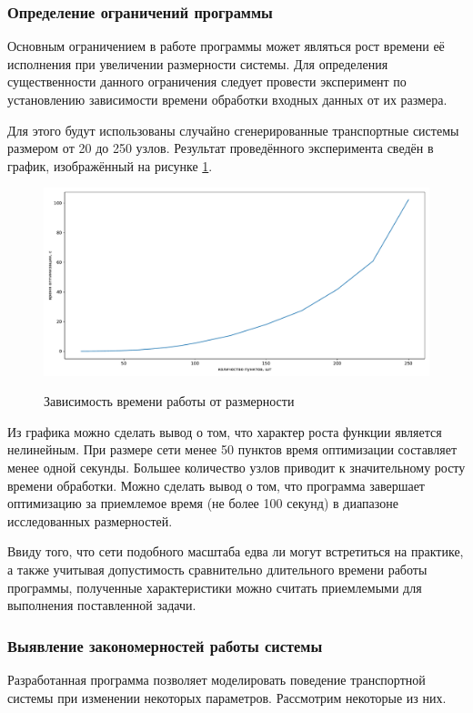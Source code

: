 \subsubsection{Определение ограничений программы}
Основным ограничением в работе программы может являться рост времени её исполнения при увеличении размерности системы. Для определения существенности данного ограничения следует провести эксперимент по установлению зависимости времени обработки входных данных от их размера.

Для этого будут использованы случайно сгенерированные транспортные системы размером от 20 до 250 узлов. Результат проведённого эксперимента сведён в график, изображённый на рисунке \ref{exp:timing}.

\begin{figure}[h!]
	\begin{center}
		{\includegraphics[scale=0.5, angle=0, page=1]{img/research/timing.pdf}}
		\caption{Зависимость времени работы от размерности}
		\label{exp:timing}
	\end{center}
\end{figure}

Из графика можно сделать вывод о том, что характер роста функции является нелинейным. При размере сети менее 50 пунктов время оптимизации составляет менее одной секунды. Большее количество узлов приводит к значительному росту времени обработки. Можно сделать вывод о том, что программа завершает оптимизацию за приемлемое время (не более 100 секунд) в диапазоне исследованных размерностей. 

Ввиду того, что сети подобного масштаба едва ли могут встретиться на практике, а также учитывая допустимость сравнительно длительного времени работы программы, полученные характеристики можно считать приемлемыми для выполнения поставленной задачи.

\subsubsection{Выявление закономерностей работы системы}
Разработанная программа позволяет моделировать поведение транспортной системы при изменении некоторых параметров. Рассмотрим некоторые из них.

